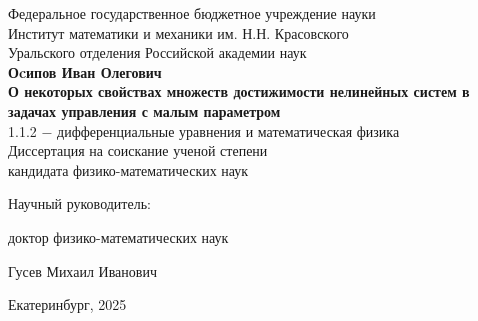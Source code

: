 \documentclass[../main.tex]{subfiles}
\begin{document}
\begin{titlepage}
    \begin{center}
        \large{Федеральное государственное бюджетное учреждение науки} \\
        \large{Институт математики и механики им. Н.Н. Красовского} \\ 
        \large{Уральского отделения Российской академии наук} \\ 
        \vspace*{4cm}
        \large{\textbf{Оcипов Иван Олегович}}\\
        \vspace*{1cm}
        \Large{\textbf{О некоторых свойствах множеств достижимости нелинейных систем в задачах управления с малым параметром}}\\
        \vspace*{1cm}
        \large{1.1.2 $-$ дифференциальные уравнения и математическая физика}\\
        \vspace*{1cm}
        \large{Диссертация на соискание ученой степени \\
        кандидата физико-математических наук}\\
    \end{center}
    \vspace*{3cm}
        
    \hspace*{82mm}\large{Научный руководитель:}

    \hspace*{82mm}\large{доктор физико-математических наук} 

    \hspace*{82mm}\large{Гусев Михаил Иванович}
        
    \vspace*{\fill}
    \begin{center}
        \large{Екатеринбург, 2025}
    \end{center}
\end{titlepage}
\end{document}
